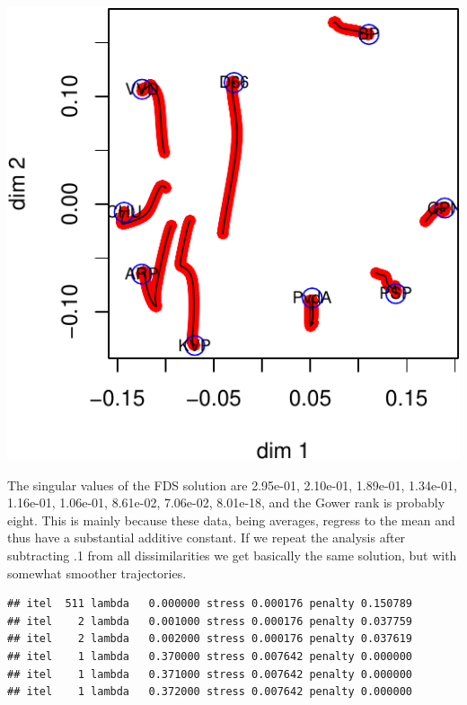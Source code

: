\documentclass[
  12pt,
]{article}
\begin{document}
\begin{center}\includegraphics{penalty_files/figure-latex/poldist2-1} \end{center}

The singular values of the FDS solution are 2.95e-01, 2.10e-01,
1.89e-01, 1.34e-01, 1.16e-01, 1.06e-01, 8.61e-02, 7.06e-02, 8.01e-18,
and the Gower rank is probably eight. This is mainly because these data,
being averages, regress to the mean and thus have a substantial additive
constant. If we repeat the analysis after subtracting .1 from all
dissimilarities we get basically the same solution, but with somewhat
smoother trajectories.

\begin{verbatim}
## itel  511 lambda   0.000000 stress 0.000176 penalty 0.150789 
## itel    2 lambda   0.001000 stress 0.000176 penalty 0.037759 
## itel    2 lambda   0.002000 stress 0.000176 penalty 0.037619 
## itel    1 lambda   0.370000 stress 0.007642 penalty 0.000000 
## itel    1 lambda   0.371000 stress 0.007642 penalty 0.000000 
## itel    1 lambda   0.372000 stress 0.007642 penalty 0.000000
\end{verbatim}
\end{document}
